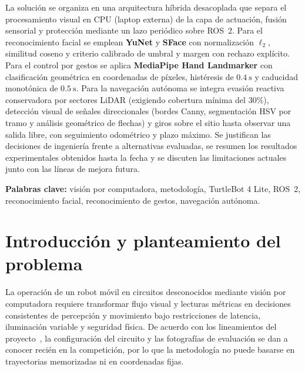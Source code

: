 \documentclass[11pt,a4paper]{article}
\begin{document}
La solución se organiza en una arquitectura híbrida desacoplada que separa el
procesamiento visual en CPU (laptop externa) de la capa de actuación, fusión
sensorial y protección mediante un lazo periódico sobre ROS~2. Para el reconocimiento facial
se emplean \textbf{YuNet} y \textbf{SFace} con normalización $\ell_2$,
similitud coseno y criterio calibrado de umbral y margen con rechazo explícito.
Para el control por gestos se aplica \textbf{MediaPipe Hand Landmarker} con
clasificación geométrica en coordenadas de píxeles, histéresis de
$0.4\ \mathrm{s}$ y caducidad monotónica de $0.5\ \mathrm{s}$. Para la
navegación autónoma se integra evasión reactiva conservadora por sectores
LiDAR (exigiendo cobertura mínima del $30\%$), detección visual de señales
direccionales (bordes Canny, segmentación HSV por tramo y análisis geométrico
de flechas) y giros sobre el sitio hasta observar una salida libre, con
seguimiento odométrico y plazo máximo. Se
justifican las decisiones de ingeniería frente a alternativas evaluadas, se
resumen los resultados experimentales obtenidos hasta la fecha y se discuten
las limitaciones actuales junto con las líneas de mejora futura.

\textbf{Palabras clave:} visión por computadora, metodología, TurtleBot 4 Lite,
ROS~2, reconocimiento facial, reconocimiento de gestos, navegación autónoma.

\newpage
\tableofcontents
\clearpage
{}

\section{Introducción y planteamiento del problema}

La operación de un robot móvil en circuitos desconocidos mediante visión por
computadora requiere transformar flujo visual y lecturas métricas en decisiones
consistentes de percepción y movimiento bajo restricciones de latencia,
iluminación variable y seguridad física. De acuerdo con los lineamientos del
proyecto~\cite{enunciado}, la configuración del circuito y las fotografías de
evaluación se dan a conocer recién en la competición, por lo que la metodología
no puede basarse en trayectorias memorizadas ni en coordenadas fijas.
\end{document}
